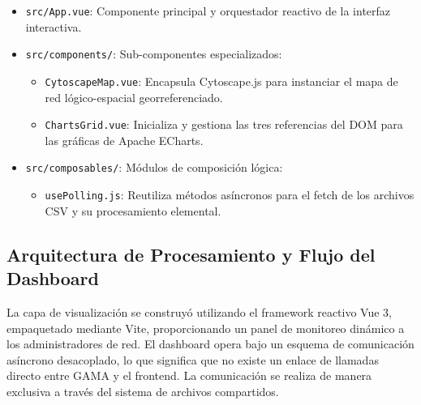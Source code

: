 \begin{itemize}
\begin{itemize}
\begin{itemize}
        \end{itemize}
        \item \texttt{src/App.vue}: Componente principal y orquestador reactivo de la interfaz interactiva.
        \item \texttt{src/components/}: Sub-componentes especializados:
        \begin{itemize}
            \item \texttt{CytoscapeMap.vue}: Encapsula Cytoscape.js para instanciar el mapa de red lógico-espacial georreferenciado.
            \item \texttt{ChartsGrid.vue}: Inicializa y gestiona las tres referencias del DOM para las gráficas de Apache ECharts.
        \end{itemize}
        \item \texttt{src/composables/}: Módulos de composición lógica:
        \begin{itemize}
            \item \texttt{usePolling.js}: Reutiliza métodos asíncronos para el fetch de los archivos CSV y su procesamiento elemental.
        \end{itemize}
    \end{itemize}
\end{itemize}

\subsection{Arquitectura de Procesamiento y Flujo del Dashboard}
La capa de visualización se construyó utilizando el framework reactivo Vue 3, empaquetado mediante Vite, proporcionando un panel de monitoreo dinámico a los administradores de red. El dashboard opera bajo un esquema de comunicación asíncrono desacoplado, lo que significa que no existe un enlace de llamadas directo entre GAMA y el frontend. La comunicación se realiza de manera exclusiva a través del sistema de archivos compartidos.

